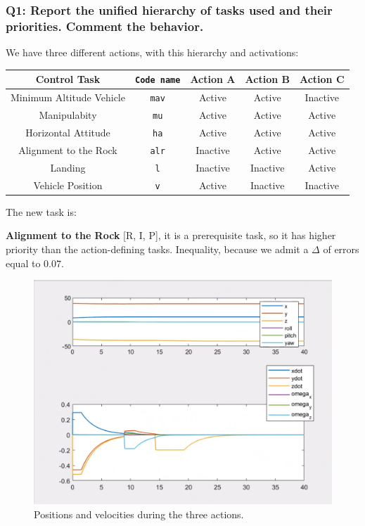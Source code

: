 \documentclass{article}
\newcommand{\ocio} {\marginpar{!}}
\begin{document}
\subsubsection{Q1: Report the unified hierarchy of tasks used and their priorities. Comment the behavior.}
We have three different actions, with this hierarchy and activations:
\begin{center}
\begin{tabular}{ | c | c | c | c | c |}
\hline
 Control Task & \texttt{Code name} & Action A & Action B & Action C\\
 \hline
 Minimum Altitude Vehicle &  \texttt{mav} & Active & Active & Inactive\\  
 Manipulabity &  \texttt{mu} & Active & Active & Active\\
 Horizontal Attitude &  \texttt{ha} & Active & Active & Active\\
 Alignment to the Rock & \texttt{alr} & Inactive & Active & Active \\
 Landing & \texttt{l} &Inactive & Inactive & Active \\
 Vehicle Position &  \texttt{v} &Active & Inactive & Inactive\\
 \hline
\end{tabular}
\end{center}
\vspace{5px}
\noindent
The new task is:
\begin{description}
\item \textbf{Alignment to the Rock} [R, I, P], it is a prerequisite task, so it has higher priority than the action-defining tasks. Inequality, because we admit a $\Delta$ of errors equal to $0.07$.   \ocio 
\end{description}

\begin{figure}[h]
    \centering
    \includegraphics[scale=0.3]{311_ppdot.png}
    \caption{Positions and velocities during the three actions.}
    \label{graphes3}
\end{figure}
\end{document}
